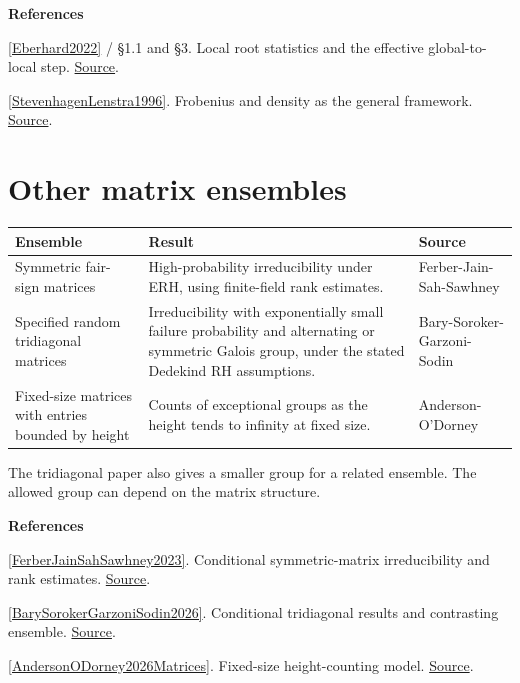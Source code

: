 \documentclass[11pt,a4paper,oneside,openany]{book}
\newenvironment{sources}{\par\smallskip\begingroup\footnotesize\color{atlasgray}\leftskip=10pt\setlength{\parskip}{2pt}}{\par\endgroup\smallskip}
\begin{document}
\begin{sources}
\textbf{References}\par\smallskip
\noindent\hyperlink{ref:Eberhard2022}{[Eberhard2022]} / §1.1 and §3. Local root statistics and the effective global-to-local step. \href{https://arxiv.org/abs/2008.01223}{Source}.\par
\noindent\hyperlink{ref:StevenhagenLenstra1996}{[StevenhagenLenstra1996]}. Frobenius and density as the general framework. \href{https://pub.math.leidenuniv.nl/~lenstrahw/PUBLICATIONS/1996d/art.pdf}{Source}.\par
\end{sources}\color{black}
\section{Other matrix ensembles}
\begin{center}\small\begin{tabularx}{\linewidth}{@{}>{\raggedright\arraybackslash}X>{\raggedright\arraybackslash}X>{\raggedright\arraybackslash}X@{}}\toprule
\textbf{Ensemble} & \textbf{Result} & \textbf{Source} \\
\midrule
Symmetric fair-sign matrices & High-probability irreducibility under ERH, using finite-field rank estimates. & Ferber-Jain-Sah-Sawhney \\
Specified random tridiagonal matrices & Irreducibility with exponentially small failure probability and alternating or symmetric Galois group, under the stated Dedekind RH assumptions. & Bary-Soroker-Garzoni-Sodin \\
Fixed-size matrices with entries bounded by height & Counts of exceptional groups as the height tends to infinity at fixed size. & Anderson-O'Dorney \\
\bottomrule\end{tabularx}\end{center}
\color{black} The tridiagonal paper also gives a smaller group for a related ensemble. The allowed group can depend on the matrix structure.\par
\begin{sources}
\textbf{References}\par\smallskip
\noindent\hyperlink{ref:FerberJainSahSawhney2023}{[FerberJainSahSawhney2023]}. Conditional symmetric-matrix irreducibility and rank estimates. \href{https://arxiv.org/abs/2106.04049}{Source}.\par
\noindent\hyperlink{ref:BarySorokerGarzoniSodin2026}{[BarySorokerGarzoniSodin2026]}. Conditional tridiagonal results and contrasting ensemble. \href{https://arxiv.org/abs/2502.17218}{Source}.\par
\noindent\hyperlink{ref:AndersonODorney2026Matrices}{[AndersonODorney2026Matrices]}. Fixed-size height-counting model. \href{https://www.cambridge.org/core/journals/mathematical-proceedings-of-the-cambridge-philosophical-society/article/galois-groups-of-random-integer-matrices/B87E2B0D71138A94EF7BB1179891456A}{Source}.\par
\end{sources}\color{black}
\end{document}
